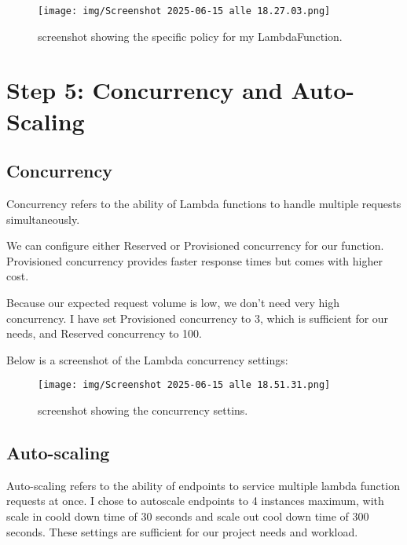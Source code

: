 \documentclass[12pt,a4paper]{article}
\begin{document}
\newpage

\begin{figure}[htbp]
  \centering
  \texttt{[image: img/Screenshot 2025-06-15 alle 18.27.03.png]}
  \caption{screenshot showing the specific policy for my LambdaFunction.}
  \label{fig:example}
\end{figure}


\section{Step 5: Concurrency and Auto-Scaling}
\subsection{Concurrency}
Concurrency refers to the ability of Lambda functions to handle multiple requests simultaneously.

We can configure either Reserved or Provisioned concurrency for our function. Provisioned concurrency provides faster response times but comes with higher cost.

Because our expected request volume is low, we don’t need very high concurrency. I have set Provisioned concurrency to 3, which is sufficient for our needs, and Reserved concurrency to 100.

Below is a screenshot of the Lambda concurrency settings:

\begin{figure}[htbp]
  \centering
  \texttt{[image: img/Screenshot 2025-06-15 alle 18.51.31.png]}
  \caption{screenshot showing the concurrency settins.}
  \label{fig:example}
\end{figure}

\subsection{Auto-scaling}
Auto-scaling refers to the ability of endpoints to service multiple
lambda function requests at once. I chose to autoscale endpoints to 4
instances maximum, with scale in coold down time of 30 seconds and scale
out cool down time of 300 seconds. These settings are sufficient for our
project needs and workload.
\end{document}
